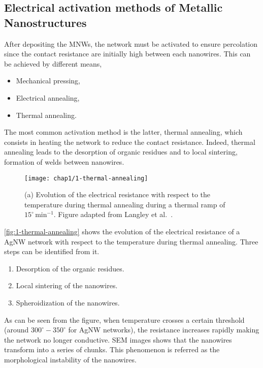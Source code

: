 \subsection{Electrical activation methods of Metallic Nanostructures}
    After depositing the MNWs, the network must be activated to ensure percolation since the contact resistance are initially high between each nanowires. This can be achieved by different means,
    \begin{itemize}
        \item Mechanical pressing,
        \item Electrical annealing,
        \item Thermal annealing.
    \end{itemize}
    The most common activation method is the latter, thermal annealing, which consists in heating the network to reduce the contact resistance. Indeed, thermal annealing leads to the desorption of organic residues and to local sintering, formation of welds between nanowires.
    \begin{figure}[H]
        \centering
        \texttt{[image: chap1/1-thermal-annealing]}
        \caption{(a) Evolution of the electrical resistance with respect to the temperature during thermal annealing during a thermal ramp of $15^\circ\,\text{min}^{-1}$. Figure adapted from Langley et al.\ \cite{Langley2014}.}
        \label{fig:1-thermal-annealing}
    \end{figure}
    \autoref{fig:1-thermal-annealing} shows the evolution of the electrical resistance of a AgNW network with respect to the temperature during thermal annealing. Three steps can be identified from it.
    \begin{enumerate}
        \item Desorption of the organic residues.
        \item Local sintering of the nanowires.
        \item Spheroidization of the nanowires.
    \end{enumerate}
    As can be seen from the figure, when temperature crosses a certain threshold (around $300^\circ - 350^\circ$ for AgNW networks), the resistance increases rapidly making the network no longer conductive. SEM images shows that the nanowires transform into a series of chunks. This phenomenon is referred as the morphological instability of the nanowires.

